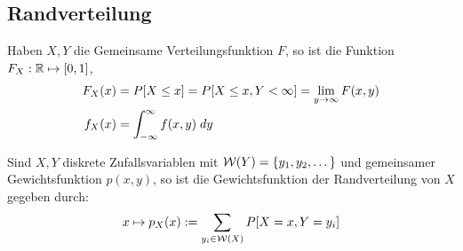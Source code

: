 \subsection{Randverteilung}
Haben $X, Y$ die Gemeinsame Verteilungsfunktion $F$, so ist die Funktion $F_X:
  \mathbb{R} \mapsto [0, 1]$,
\begin{align*}
  F_X (x) & = P[X \leq x] = P[X \leq x, Y < \infty] = \lim_{y \rightarrow \infty} F (x, y) \\
  f_X (x) & = \int_{-\infty}^\infty f (x, y) \; dy
\end{align*}



Sind $X, Y$ diskrete Zufallsvariablen mit $\mathcal{W} (Y) = \{y_1, y_2, \dots\}$
und gemeinsamer Gewichtsfunktion $p (x, y)$, so ist die Gewichtsfunktion
der Randverteilung von $X$ gegeben durch:
\begin{align*}
  x \mapsto p_X (x) := \sum_{y_i \in \mathcal{W} (X)} P[X = x, Y = y_i]
\end{align*}
\BoxStart{}
